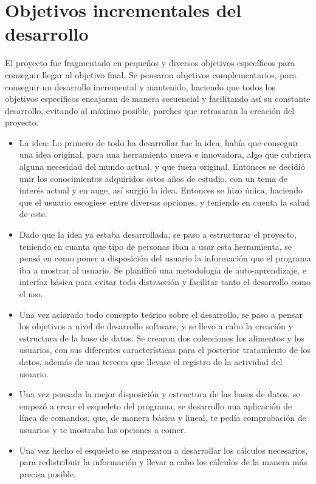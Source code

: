 \section{Objetivos incrementales del desarrollo}
El proyecto fue fragmentado en pequeños y diversos objetivos específicos para conseguir llegar al  objetivo final. Se pensaron objetivos complementarios, para conseguir un desarrollo incremental y mantenido, haciendo que todos los objetivos específicos encajaran de manera secuencial y facilitando así su constante desarrollo, evitando al máximo posible, parches que retrasaran la creación del proyecto.
\begin{itemize}
\item La idea: Lo primero de todo ha desarrollar fue la idea, había que conseguir una idea original, para una herramienta nueva e innovadora, algo que cubriera alguna necesidad del mundo actual, y que fuera original. Entonces se decidió unir los conocimientos adquiridos estos años de estudio, con un tema de interés actual y en auge, así surgió la idea. Entonces se hizo única, haciendo que el usuario escogiese entre diversas opciones, y teniendo en cuenta la salud de este.
\item Dado que la idea ya estaba desarrollada, se paso a estructurar el proyecto, teniendo en cuanta que tipo de personas iban a usar esta herramienta, se pensó en como poner a disposición del usuario la información que el programa iba a mostrar al usuario. Se planificó una metodología de auto-aprendizaje, e interfaz básica para evitar toda distracción y facilitar tanto el desarrollo como el uso.
\item Una vez aclarado todo concepto teórico sobre el desarrollo, se paso a pensar los objetivos a nivel de desarrollo software, y se llevo a cabo la creación y estructura de la base de datos. Se crearon dos colecciones los alimentos y los usuarios, con sus diferentes características para el posterior tratamiento de los datos, además de una tercera que llevase el registro de la actividad del usuario.
\item Una vez pensada la mejor disposición y estructura de las bases de datos, se empezó a crear el esqueleto del programa, se desarrollo una aplicación de línea de comandos, que, de manera básica y lineal, te pedía comprobación de usuarios y te mostraba las opciones a comer.
\item	Una vez hecho el esqueleto se empezaron a desarrollar los cálculos necesarios, para redistribuir la información y llevar a cabo los cálculos de la manera más precisa posible.

\end{itemize}
